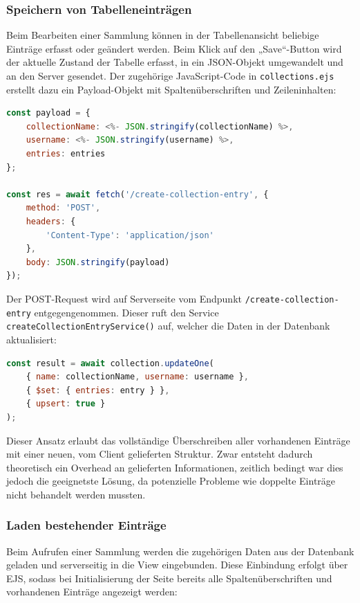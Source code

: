 \subsubsection{Speichern von Tabelleneinträgen}

Beim Bearbeiten einer Sammlung können in der Tabellenansicht beliebige Einträge erfasst oder geändert werden.
Beim Klick auf den „Save“-Button wird der aktuelle Zustand der Tabelle erfasst, in ein JSON-Objekt umgewandelt und an den Server gesendet.
Der zugehörige JavaScript-Code in \texttt{collections.ejs} erstellt dazu ein Payload-Objekt mit Spaltenüberschriften und Zeileninhalten:

\begin{lstlisting}[language=JavaScript, caption=Payload-Erstellung im Frontend]
const payload = {
    collectionName: <%- JSON.stringify(collectionName) %>,
    username: <%- JSON.stringify(username) %>,
    entries: entries
};

const res = await fetch('/create-collection-entry', {
    method: 'POST',
    headers: {
        'Content-Type': 'application/json'
    },
    body: JSON.stringify(payload)
});
\end{lstlisting}

Der POST-Request wird auf Serverseite vom Endpunkt \texttt{/create-collection-entry} entgegengenommen.
Dieser ruft den Service \texttt{createCollectionEntryService()} auf, welcher die Daten in der Datenbank aktualisiert:

\begin{lstlisting}[language=JavaScript, caption=Service-Logik zum Überschreiben von Einträgen]
const result = await collection.updateOne(
    { name: collectionName, username: username },
    { $set: { entries: entry } },
    { upsert: true }
);
\end{lstlisting}

Dieser Ansatz erlaubt das vollständige Überschreiben aller vorhandenen Einträge mit einer neuen, vom Client gelieferten Struktur.
Zwar entsteht dadurch theoretisch ein Overhead an gelieferten Informationen, zeitlich bedingt war dies jedoch die geeignetste Lösung, da potenzielle Probleme wie doppelte Einträge nicht behandelt werden mussten.

\subsubsection{Laden bestehender Einträge}

Beim Aufrufen einer Sammlung werden die zugehörigen Daten aus der Datenbank geladen und serverseitig in die View eingebunden.
Diese Einbindung erfolgt über EJS, sodass bei Initialisierung der Seite bereits alle Spaltenüberschriften und vorhandenen Einträge angezeigt werden:

